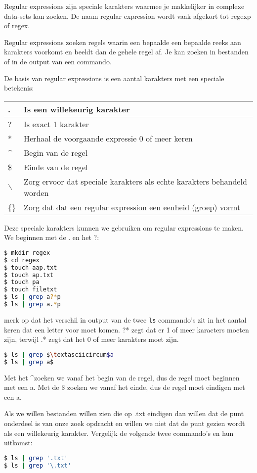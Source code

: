 Regular expressions zijn speciale karakters waarmee je makkelijker in complexe data-sets kan zoeken. De naam regular expression wordt vaak afgekort tot regexp of regex.

Regular expressions zoeken regels waarin een bepaalde een bepaalde reeks aan karakters voorkomt en beeldt dan de gehele regel af. Je kan zoeken in bestanden of in de output van een commando.

De basis van regular expressions is een aantal karakters met een speciale betekenis:

\begin{tabular}{| l | l |}
\hline
. & Is een willekeurig karakter \\
\hline
? & Is exact 1 karakter \\
\hline
* & Herhaal de voorgaande expressie 0 of meer keren \\
\hline
\textasciicircum & Begin van de regel \\
\hline
\$ & Einde van de regel \\
\hline
$\backslash$ & Zorg ervoor dat speciale karakters als echte karakters behandeld worden \\
\hline
\{\} & Zorg dat dat een regular expression een eenheid (groep) vormt \\
\hline
\end{tabular}

Deze speciale karakters kunnen we gebruiken om regular expressions te maken. We beginnen met de . en het ?:
\begin{lstlisting}[language=bash]
$ mkdir regex
$ cd regex
$ touch aap.txt
$ touch ap.txt
$ touch pa
$ touch filetxt
$ ls | grep a?*p
$ ls | grep a.*p
\end{lstlisting}
merk op dat het verschil in output van de twee \texttt{ls} commando's zit in het aantal keren dat een letter voor moet komen. ?* zegt dat er 1 of meer karacters moeten zijn, terwijl .* zegt dat het 0 of meer karakters moet zijn.

\begin{lstlisting}[language=bash]
$ ls | grep $\textasciicircum$a
$ ls | grep a$
\end{lstlisting}
Met het \textasciicircum zoeken we vanaf het begin van de regel, dus de regel moet beginnen met een a. Met de \$ zoeken we vanaf het einde, dus de regel moet eindigen met een a.

Als we willen bestanden willen zien die op .txt eindigen dan willen dat de punt onderdeel is van onze zoek opdracht en willen we niet dat de punt gezien wordt als een willekeurig karakter. Vergelijk de volgende twee commando's en hun uitkomst:
\begin{lstlisting}[language=bash]
$ ls | grep '.txt'
$ ls | grep '\.txt'
\end{lstlisting}

